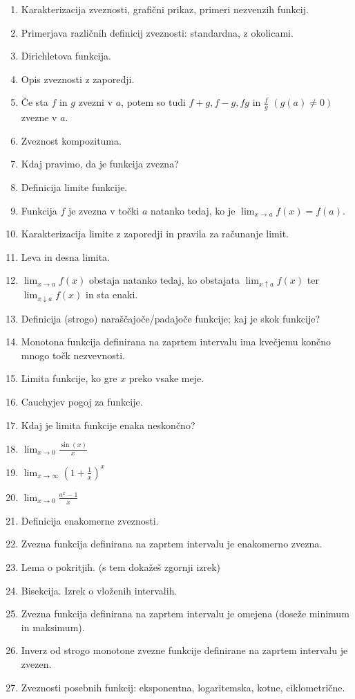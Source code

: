 \documentclass[a4paper,12pt]{report}
\begin{document}
\begin{enumerate}
    \item Karakterizacija zveznosti, grafični prikaz, primeri nezvenzih funkcij.
    \item Primerjava različnih definicij zveznosti: standardna, z okolicami.
    \item Dirichletova funkcija.
    \item Opis zveznosti z zaporedji.
    \item Če sta $f$ in $g$ zvezni v $a$, potem so tudi $f+g, f-g, fg $ in $\frac{f}{g}$ $(g(a) \neq 0)$ zvezne v $a$.
    \item Zveznost kompozituma.
    \item Kdaj pravimo, da je funkcija zvezna?
    \item Definicija limite funkcije.
    \item Funkcija $f$ je zvezna v točki $a$ natanko tedaj, ko je $\lim_{x \to a} f(x) = f(a)$.
    \item Karakterizacija limite z zaporedji in pravila za računanje limit.
    \item Leva in desna limita.
    \item $\lim_{x \to a} f(x)$ obstaja natanko tedaj, ko obstajata $\lim_{x \uparrow a} f(x)$ ter $\lim_{x \downarrow a} f(x)$ in sta enaki.
    \item Definicija (strogo) naraščajoče/padajoče funkcije; kaj je skok funkcije?
    \item Monotona funkcija definirana na zaprtem intervalu ima kvečjemu končno mnogo točk nezvevnosti.
    \item Limita funkcije, ko gre $x$ preko vsake meje.
    \item Cauchyjev pogoj za funkcije.
    \item Kdaj je limita funkcije enaka neskončno?
    \item $\lim_{x \to 0} \frac{\sin(x)}{x}$
    \item $\lim_{x \to \infty}(1 + \frac{1}{x})^x$
    \item $\lim_{x \to 0} \frac{a^x - 1}{x}$
    \item Definicija enakomerne zveznosti.
    \item Zvezna funkcija definirana na zaprtem intervalu je enakomerno zvezna.
    \item Lema o pokritjih. (s tem dokažeš zgornji izrek)
    \item Bisekcija. Izrek o vloženih intervalih.
    \item Zvezna funkcija definirana na zaprtem intervalu je omejena (doseže minimum in maksimum).
    \item Inverz od strogo monotone zvezne funkcije definirane na zaprtem intervalu je zvezen.
    \item Zveznosti posebnih funkcij: eksponentna, logaritemska, kotne, ciklometrične.
\end{enumerate}
\end{document}
